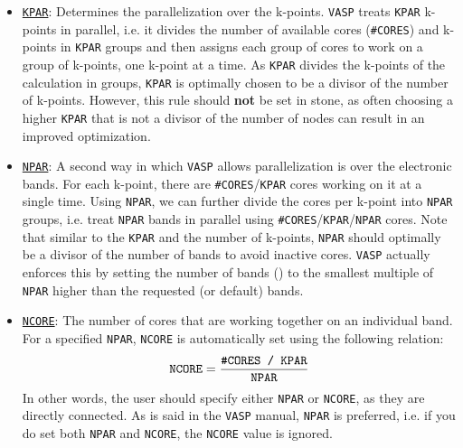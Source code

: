 \begin{refsection}
\begin{itemize}
\item \href{https://cms.mpi.univie.ac.at/wiki/index.php/KPAR}{\texttt{KPAR}}: Determines the parallelization over the k-points. \texttt{VASP} treats \texttt{KPAR} k-points in parallel, i.e. it divides the number of available cores (\texttt{\#CORES}) and k-points in \texttt{KPAR} groups and then assigns each group of cores to work on a group of k-points, one k-point at a time. As \texttt{KPAR} divides the k-points of the calculation in groups, \texttt{KPAR} is optimally chosen to be a divisor of the number of k-points. However, this rule should \textbf{not} be set in stone, as often choosing a higher \texttt{KPAR} that is not a divisor of the number of nodes can result in an improved optimization. 

\item \href{https://cms.mpi.univie.ac.at/wiki/index.php/NPAR}{\texttt{NPAR}}: A second way in which \texttt{VASP} allows parallelization is over the electronic bands. For each k-point, there are \verb|#CORES|/\verb|KPAR| cores working on it at a single time. Using \verb|NPAR|, we can further divide the cores per k-point into \verb|NPAR| groups, i.e. treat \verb|NPAR| bands in parallel using \verb|#CORES|/\verb|KPAR|/\verb|NPAR| cores. Note that similar to the \verb|KPAR| and the number of k-points,  \verb|NPAR| should optimally be a divisor of the number of bands to avoid inactive cores. \texttt{VASP} actually enforces this by setting the number of bands () to the smallest multiple of \verb|NPAR| higher than the requested (or default) bands.

\item \href{https://cms.mpi.univie.ac.at/wiki/index.php/NCORE}{\texttt{NCORE}}: The number of cores that are working together on an individual band. For a specified \verb|NPAR|, \verb|NCORE| is automatically set using the following relation:
\begin{equation*}
\texttt{NCORE} = \frac{\texttt{\#CORES / \texttt{KPAR}}}{\texttt{NPAR}}
\end{equation*}
In other words, the user should specify either \verb|NPAR| or \verb|NCORE|, as they are directly connected. As is said in the \texttt{VASP} manual, \verb|NPAR| is preferred, i.e. if you do set both \verb|NPAR| and \verb|NCORE|, the \verb|NCORE| value is ignored.



\end{itemize}
\end{refsection}
